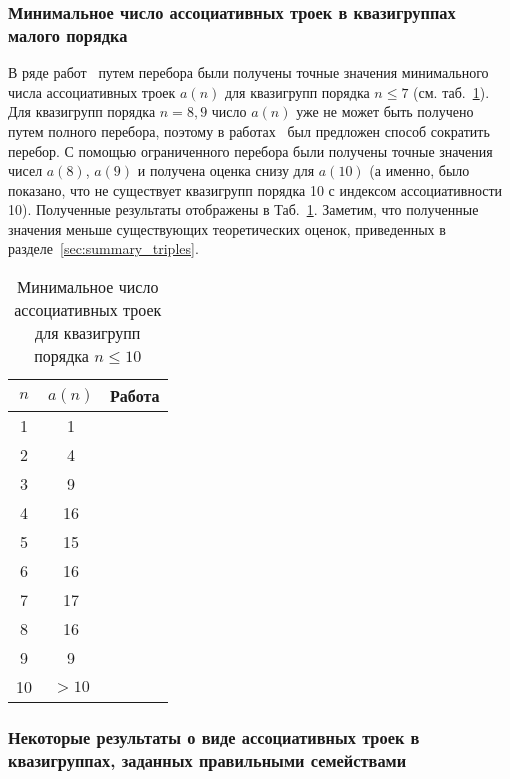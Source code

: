 \subsubsection{Минимальное число ассоциативных троек в квазигруппах малого порядка}
    В ряде работ~\cite{ass_summary, groek11, valent16} путем перебора были получены точные значения минимального числа ассоциативных троек $a(n)$ для квазигрупп порядка $n \le 7$ (см. таб.~\ref{tab:assoctriples}).
    Для квазигрупп порядка $n = 8, 9$ число $a(n)$ уже не может быть получено путем полного перебора, поэтому в работах~\cite{valent2018small, drapal2019high, drapal2020extreme} был предложен способ сократить перебор.
    С помощью ограниченного перебора были получены точные значения чисел $a(8)$, $a(9)$ и получена оценка снизу для $a(10)$ (а именно, было показано, что не существует квазигрупп порядка 10 с индексом ассоциативности 10).
    Полученные результаты отображены в Таб.~\ref{tab:assoctriples}.
    Заметим, что полученные значения меньше существующих теоретических оценок, приведенных в разделе~\ref{sec:summary_triples}.
    \begin{table}
        \centering
        \captionsetup{justification=centering} %
        \caption{\label{tab:assoctriples} Минимальное число ассоциативных троек для квазигрупп порядка $n \le 10$}
        \begin{tabular}{c|c|c}
            $n$ & $a(n)$ & Работа \\ 
            \toprule
            1 & 1  & \cite{ass_summary} \\
            2 & 4  & \cite{ass_summary} \\
            3 & 9  & \cite{ass_summary} \\
            4 & 16 & \cite{ass_summary} \\
            5 & 15 & \cite{ass_summary} \\
            6 & 16 & \cite{ass_summary} \\
            7 & 17 & \cite{valent16} \\
            8 & 16 & \cite{drapal2019high} \\
            9 & 9  & \cite{valent2018small}  \\
            10 & $>10$ & \cite{drapal2020extreme} \\
            \bottomrule
        \end{tabular}
    \end{table}

\subsubsection{Некоторые результаты о виде ассоциативных троек в квазигруппах, заданных правильными семействами}

